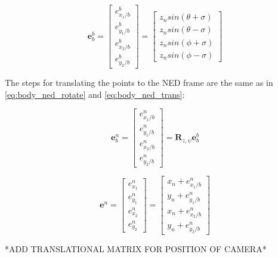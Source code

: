 \documentclass{article}
\begin{document}
\begin{equation}
	\bm{e}_b^b = 
	\begin{bmatrix}
		e^b_{x_1/b} \\ e^b_{y_1/b} \\ e^b_{x_2/b} \\ e^b_{y_2/b}
	\end{bmatrix}
	=
	\begin{bmatrix}
		z_n sin(\theta + \sigma) \\
		z_n sin(\theta - \sigma) \\
		z_n sin(\phi + \sigma) \\
		z_n sin(\phi - \sigma)
	\end{bmatrix}
\end{equation}

The steps for translating the points to the NED frame are the same as in \eqref{eq:body_ned_rotate} and \eqref{eq:body_ned_trans}:

\begin{equation}
	\bm{e}_b^n =
	\begin{bmatrix}
		e^n_{x_1/b} \\ e^n_{y_1/b} \\ e^n_{x_2/b} \\ e^n_{y_2/b}
	\end{bmatrix}
	= \bm{R}_{z,\psi} \bm{e}_b^b
\end{equation}

\begin{equation}
	\bm{e}^n =
	\begin{bmatrix}
		e^n_{x_1} \\ e^n_{y_1} \\ e^n_{x_2} \\ e^n_{y_2}
	\end{bmatrix}
	=
	\begin{bmatrix}
		x_n + e^n_{x_1/b} \\
		y_n + e^n_{y_1/b} \\
		x_n + e^n_{x_2/b} \\
		y_n + e^n_{y_2/b}
	\end{bmatrix}
\end{equation}
	
	

*ADD TRANSLATIONAL MATRIX FOR POSITION OF CAMERA* \\
\end{document}
